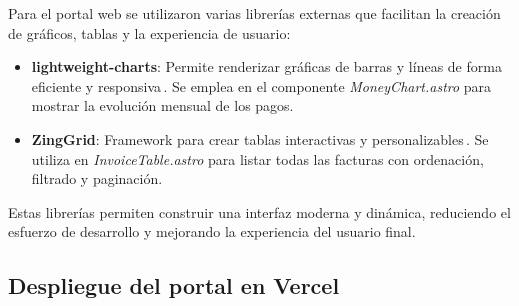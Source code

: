 \begin{large}

Para el portal web se utilizaron varias librerías externas que facilitan la creación de gráficos, tablas y la experiencia de usuario:

\begin{itemize}
    \item \textbf{lightweight-charts}: Permite renderizar gráficas de barras y líneas de forma eficiente y responsiva\,\cite{lightweight_charts}. Se emplea en el componente \textit{MoneyChart.astro} para mostrar la evolución mensual de los pagos.
    \item \textbf{ZingGrid}: Framework para crear tablas interactivas y personalizables\,\cite{zinggrid}. Se utiliza en \textit{InvoiceTable.astro} para listar todas las facturas con ordenación, filtrado y paginación.
\end{itemize}

Estas librerías permiten construir una interfaz moderna y dinámica, reduciendo el esfuerzo de desarrollo y mejorando la experiencia del usuario final.

\end{large}

\subsection{Despliegue del portal en Vercel}

